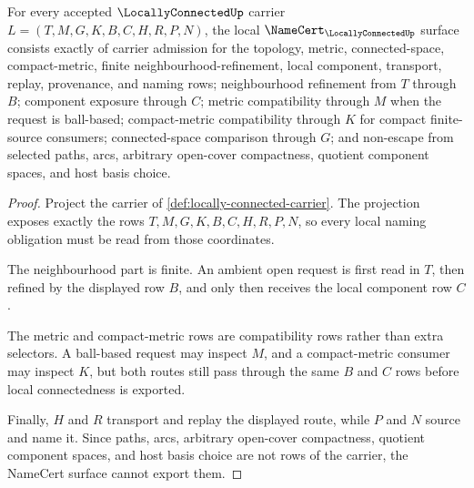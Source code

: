 \begin{theorem}
\label{thm:locally-connected-namecert-obligations}
For every accepted $\LocallyConnectedUp$ carrier $L=(T,M,G,K,B,C,H,R,P,N)$, the local $\NameCert_{\LocallyConnectedUp}$ surface consists exactly of carrier admission for the topology, metric, connected-space, compact-metric, finite neighbourhood-refinement, local component, transport, replay, provenance, and naming rows; neighbourhood refinement from $T$ through $B$; component exposure through $C$; metric compatibility through $M$ when the request is ball-based; compact-metric compatibility through $K$ for compact finite-source consumers; connected-space comparison through $G$; and non-escape from selected paths, arcs, arbitrary open-cover compactness, quotient component spaces, and host basis choice.
\end{theorem}
\begin{proof}
Project the carrier of \autoref{def:locally-connected-carrier}. The projection exposes exactly the rows $T,M,G,K,B,C,H,R,P,N$, so every local naming obligation must be read from those coordinates.

The neighbourhood part is finite. An ambient open request is first read in $T$, then refined by the displayed row $B$, and only then receives the local component row $C$.

The metric and compact-metric rows are compatibility rows rather than extra selectors. A ball-based request may inspect $M$, and a compact-metric consumer may inspect $K$, but both routes still pass through the same $B$ and $C$ rows before local connectedness is exported.

Finally, $H$ and $R$ transport and replay the displayed route, while $P$ and $N$ source and name it. Since paths, arcs, arbitrary open-cover compactness, quotient component spaces, and host basis choice are not rows of the carrier, the NameCert surface cannot export them.
\end{proof}

